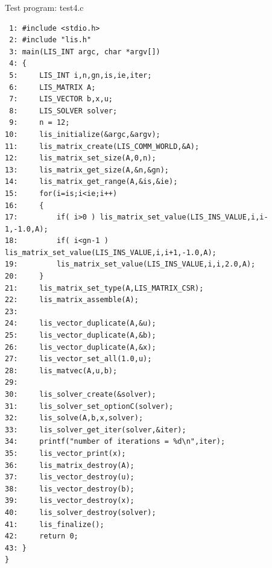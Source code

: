 \documentclass[a4paper]{article}
\begin{document}
\begin{itembox}[l]{Test program: test4.c}
{\small
\begin{verbatim}
 1: #include <stdio.h> 
 2: #include "lis.h" 
 3: main(LIS_INT argc, char *argv[]) 
 4: { 
 5:     LIS_INT i,n,gn,is,ie,iter; 
 6:     LIS_MATRIX A; 
 7:     LIS_VECTOR b,x,u; 
 8:     LIS_SOLVER solver; 
 9:     n = 12; 
10:     lis_initialize(&argc,&argv); 
11:     lis_matrix_create(LIS_COMM_WORLD,&A); 
12:     lis_matrix_set_size(A,0,n); 
13:     lis_matrix_get_size(A,&n,&gn);
14:     lis_matrix_get_range(A,&is,&ie);
15:     for(i=is;i<ie;i++) 
16:     { 
17:         if( i>0 ) lis_matrix_set_value(LIS_INS_VALUE,i,i-1,-1.0,A); 
18:         if( i<gn-1 ) lis_matrix_set_value(LIS_INS_VALUE,i,i+1,-1.0,A); 
19:         lis_matrix_set_value(LIS_INS_VALUE,i,i,2.0,A); 
20:     } 
21:     lis_matrix_set_type(A,LIS_MATRIX_CSR); 
22:     lis_matrix_assemble(A); 
23:  
24:     lis_vector_duplicate(A,&u); 
25:     lis_vector_duplicate(A,&b); 
26:     lis_vector_duplicate(A,&x); 
27:     lis_vector_set_all(1.0,u); 
28:     lis_matvec(A,u,b); 
29:  
30:     lis_solver_create(&solver); 
31:     lis_solver_set_optionC(solver); 
32:     lis_solve(A,b,x,solver); 
33:     lis_solver_get_iter(solver,&iter); 
34:     printf("number of iterations = %d\n",iter); 
35:     lis_vector_print(x); 
36:     lis_matrix_destroy(A); 
37:     lis_vector_destroy(u); 
38:     lis_vector_destroy(b); 
39:     lis_vector_destroy(x); 
40:     lis_solver_destroy(solver); 
41:     lis_finalize(); 
42:     return 0; 
43: } 
}
\end{verbatim}
}
\end{itembox}
\end{document}
